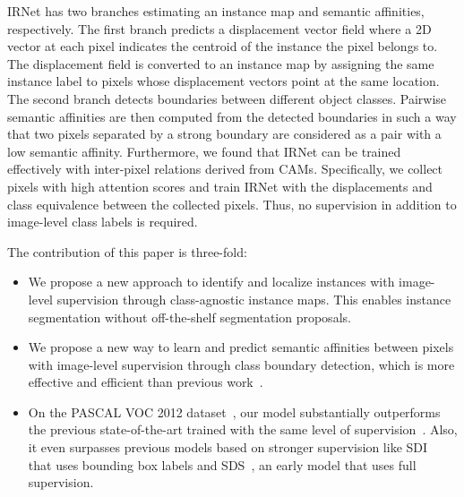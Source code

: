 IRNet has two branches estimating an instance map and semantic affinities, respectively. 
The first branch predicts a displacement vector field where a 2D vector at each pixel indicates the centroid of the instance the pixel belongs to.
The displacement field is converted to an instance map by assigning the same instance label to pixels whose displacement vectors point at the same location.
The second branch detects boundaries between different object classes.
Pairwise semantic affinities are then computed from the detected boundaries in such a way that two pixels separated by a strong boundary are considered as a pair with a low semantic affinity.
Furthermore, we found that IRNet can be trained effectively with inter-pixel relations derived from CAMs.
Specifically, we collect pixels with high attention scores and train IRNet with the displacements and class equivalence between the collected pixels.
Thus, no supervision in addition to image-level class labels is required.


The contribution of this paper is three-fold:
\vspace{-2mm}
\begin{itemize}[leftmargin=5mm] 
\itemsep=-1mm
\item We propose a new approach to identify and localize instances with image-level supervision through class-agnostic instance maps. 
This enables instance segmentation without off-the-shelf segmentation proposals.
\item We propose a new way to learn and predict semantic affinities between pixels with image-level supervision through class boundary detection, which is more effective and efficient than previous work~\cite{affinitynet}.
\item On the PASCAL VOC 2012 dataset~\cite{Pascalvoc}, our model substantially outperforms the previous state-of-the-art trained with the same level of supervision~\cite{PRM}. 
Also, it even surpasses previous models based on stronger supervision like SDI~\cite{SDI} that uses bounding box labels and SDS~\cite{Sds}, an early model that uses full supervision. \end{itemize}

\iffalse
The rest of the paper is organized as follows.
\Sec{relatedwork} summarizes related work and \Sec{cams} reviews CAMs as an initial step of our framework.
We then describe details of IRNet in \Sec{irnet}, and our label synthesis method using IRNet in \Sec{labelsynth}.
\Sec{experiments} presents experimental results. Finally, \Sec{conclusion} concludes this paper.
\fi











